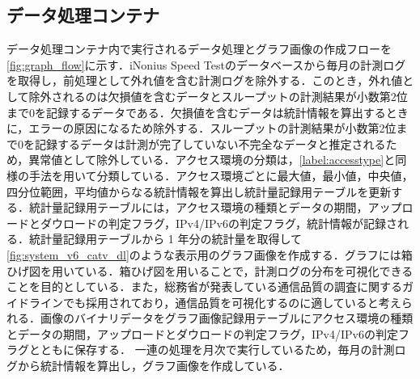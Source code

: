 \subsection{データ処理コンテナ}
データ処理コンテナ内で実行されるデータ処理とグラフ画像の作成フローを\cref{fig:graph_flow}に示す．iNonius Speed Testのデータベースから毎月の計測ログを取得し，前処理として外れ値を含む計測ログを除外する．このとき，外れ値として除外されるのは欠損値を含むデータとスループットの計測結果が小数第2位まで0を記録するデータである．欠損値を含むデータは統計情報を算出するときに，エラーの原因になるため除外する．スループットの計測結果が小数第2位まで0を記録するデータは計測が完了していない不完全なデータと推定されるため，異常値として除外している．アクセス環境の分類は，\cref{label:accesstype}と同様の手法を用いて分類している．アクセス環境ごとに最大値，最小値，中央値，四分位範囲，平均値からなる統計情報を算出し統計量記録用テーブルを更新する．統計量記録用テーブルには，アクセス環境の種類とデータの期間，アップロードとダウロードの判定フラグ，IPv4/IPv6の判定フラグ，統計情報が記録される．統計量記録用テーブルから 1 年分の統計量を取得して\cref{fig:system_v6_catv_dl}のような表示用のグラフ画像を作成する．グラフには箱ひげ図を用いている．箱ひげ図を用いることで，計測ログの分布を可視化できることを目的としている．また，総務省が発表している通信品質の調査に関するガイドライン\cite{mobile_guideline}\cite{bb_guideline}でも採用されており，通信品質を可視化するのに適していると考えられる．画像のバイナリデータをグラフ画像記録用テーブルにアクセス環境の種類とデータの期間，アップロードとダウロードの判定フラグ，IPv4/IPv6の判定フラグとともに保存する．
一連の処理を月次で実行しているため，毎月の計測ログから統計情報を算出し，グラフ画像を作成している．

